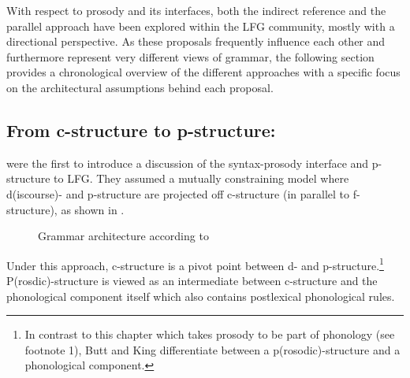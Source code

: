 \documentclass[output=paper,hidelinks]{langscibook}
\begin{document}
With respect to prosody and its interfaces, both the indirect reference and the parallel approach have been explored within the LFG community, mostly with a directional perspective. As these proposals frequently influence each other and furthermore represent very different views of grammar, the following section provides a chronological overview of the different approaches with a specific focus on the architectural assumptions behind each proposal. 

\subsection{From c-structure to p-structure: \citet{buttking98}}
\label{subsec:ButtKing}
\citet{buttking98} were the first to introduce a discussion of the syntax-prosody interface and p-structure to LFG. They assumed a mutually constraining model where d(iscourse)- and p-structure are projected off c-structure (in parallel to f-structure), as shown in .

\begin{figure}
\centering
{\small
{}
}
\caption{Grammar architecture according to \citet[][modified]{buttking98}}
\label{Fig:archButtKing}
\end{figure}

\noindent Under this approach, c-structure is a pivot point between d- and p-structure.\footnote{In contrast to this chapter which takes prosody to be part of phonology (see footnote 1), Butt and King differentiate between a p(rosodic)-structure and a phonological component.}
P(rosdic)-structure is viewed as an intermediate between c-structure and the phonological component itself which also contains postlexical phonological rules.
\end{document}
